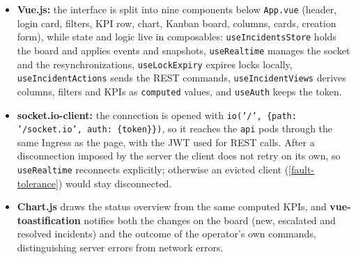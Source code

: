 \documentclass{scrartcl}
\begin{document}
\begin{itemize}
  \item \textbf{Vue.js:} the interface is split into nine components below \texttt{App.vue} (header, login card, filters, KPI row, chart, Kanban board, columns, cards, creation form), while state and logic live in composables: \texttt{useIncidentsStore} holds the board and applies events and snapshots, \texttt{useRealtime} manages the socket and the resynchronizations, \texttt{useLockExpiry} expires locks locally, \texttt{useIncidentActions} sends the REST commands, \texttt{useIncidentViews} derives columns, filters and KPIs as \texttt{computed} values, and \texttt{useAuth} keeps the token.
  \item \textbf{socket.io-client:} the connection is opened with \texttt{io('/', \{path: '/socket.io', auth: \{token\}\})}, so it reaches the \texttt{api} pods through the same Ingress as the page, with the JWT used for REST calls. After a disconnection imposed by the server the client does not retry on its own, so \texttt{useRealtime} reconnects explicitly; otherwise an evicted client (\cref{fault-tolerance}) would stay disconnected.
  \item \textbf{Chart.js} draws the status overview from the same computed KPIs, and \textbf{vue-toastification} notifies both the changes on the board (new, escalated and resolved incidents) and the outcome of the operator's own commands, distinguishing server errors from network errors.
\end{itemize}
\end{document}
